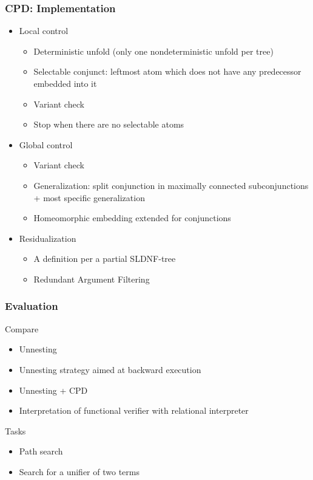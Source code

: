 \documentclass[xcolor=table]{beamer}
\begin{document}
\begin{frame}[fragile]
  \transwipe[direction=90]
  \frametitle{CPD: Implementation}
\begin{itemize} 
  \item Local control
  \begin{itemize} 
    \item Deterministic unfold (only one nondeterministic unfold per tree) 
    \item Selectable conjunct: leftmost atom which does not have any predecessor embedded into it
    \item Variant check
    \item Stop when there are no selectable atoms
  \end{itemize}  
  \item Global control
  \begin{itemize}
    \item Variant check
    \item Generalization: split conjunction in maximally connected subconjunctions + most specific generalization
    \item Homeomorphic embedding extended for conjunctions
  \end{itemize} 
  \item Residualization
  \begin{itemize}
    \item A definition per a partial SLDNF-tree
    \item Redundant Argument Filtering
  \end{itemize} 
\end{itemize}   
\end{frame}

\begin{frame}[fragile]
  \transwipe[direction=90]
  \frametitle{Evaluation}
  Compare 
  
\begin{itemize}
  \item Unnesting 
  \item Unnesting strategy aimed at backward execution
  \item Unnesting + CPD
  \item Interpretation of functional verifier with relational interpreter
\end{itemize}

Tasks 

\begin{itemize}
  \item Path search
  \item Search for a unifier of two terms
\end{itemize}
  
\end{frame}
\end{document}

